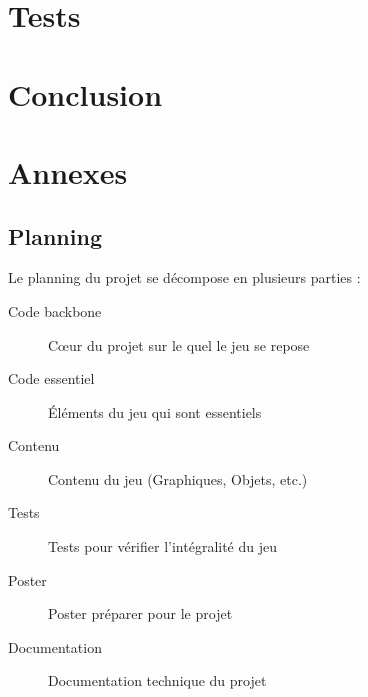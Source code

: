 \documentclass[11pt, a4paper, oneside]{report}
\begin{document}
\chapter{Tests}

\newpage
\chapter{Conclusion}

\newpage
\chapter{Annexes}
\section{Planning}
Le planning du projet se décompose en plusieurs parties :\\
\begin{description}
	\item[Code backbone] Cœur du projet sur le quel le jeu se repose
	\item[Code essentiel] Éléments du jeu qui sont essentiels
	\item[Contenu] Contenu du jeu (Graphiques, Objets, etc.)
	\item[Tests] Tests pour vérifier l'intégralité du jeu
	\item[Poster] Poster préparer pour le projet
	\item[Documentation] Documentation technique du projet
\end{description}
\end{document}

